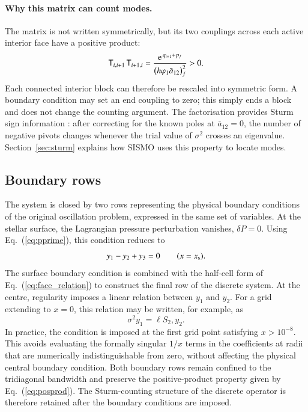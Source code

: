\documentclass[]{aa}
\begin{document}
\paragraph{Why this matrix can count modes.}
The matrix is not written symmetrically, but its two couplings across each active interior face have a positive product:
\begin{equation}
\mathsf{T}_{i,i+1}\,
\mathsf{T}_{i+1,i}
=
\frac{{\rm e}^{\,q_{i+1}+p_f}}
{\big(h\varphi_1\bar a_{12}\big)_f^2}
>0 .
\label{eq:posprod}
\end{equation}
Each connected interior block can therefore be rescaled into symmetric form. A boundary condition may set an end coupling to zero; this simply ends a block and does not change the counting argument. The factorisation provides Sturm sign information \citep[e.g.][]{wilkinson1965}: after correcting for the known poles at $\bar a_{12}=0$, the number of negative pivots changes whenever the trial value of $\sigma^2$ crosses an eigenvalue. Section~\ref{sec:sturm} explains how SISMO uses this property to locate modes.
\subsection{Boundary rows}
\label{sec:bc}

The system is closed by two rows representing the physical boundary conditions of the original oscillation problem, expressed in the same set of variables. At the stellar surface, the Lagrangian pressure perturbation vanishes,
$\delta P=0$. Using Eq.~(\ref{eq:pprime}), this condition reduces to
\begin{equation}
y_1-y_2+y_3=0
\qquad (x=x_{\rm s}).
\end{equation}
The surface boundary condition is combined with the half-cell form of Eq.~(\ref{eq:face_relation}) to construct the final row of the discrete system. At the centre, regularity imposes a linear relation between $y_1$ and $y_2$. For a grid extending to $x=0$, this relation may be written, for example, as
\begin{equation}
\sigma^2 y_1=\ell S_2,y_2.
\end{equation}
In practice, the condition is imposed at the first grid point satisfying $x>10^{-8}$. This avoids evaluating the formally singular $1/x$ terms in the coefficients at radii that are numerically indistinguishable from zero, without affecting the physical central boundary condition. Both boundary rows remain confined to the tridiagonal bandwidth and preserve the positive-product property given by Eq.~(\ref{eq:posprod}). The Sturm-counting structure of the discrete operator is therefore retained after the boundary conditions are imposed.
\end{document}
